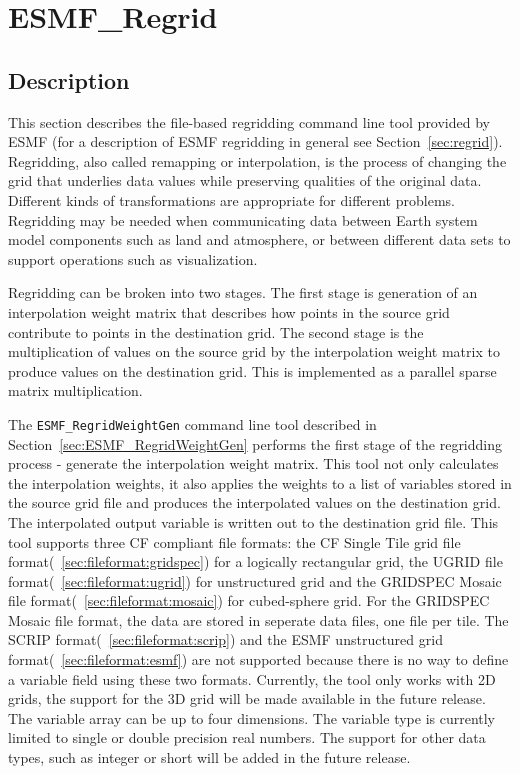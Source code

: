 
\section{ESMF\_Regrid}
\label{sec:ESMF_Regrid}

\subsection{Description}

This section describes the file-based regridding command line tool provided by ESMF (for a description of ESMF regridding in general see Section~\ref{sec:regrid}). Regridding, also called remapping or interpolation, is the process of changing the grid that underlies data values while preserving qualities of the original data. Different kinds of transformations are appropriate for different problems. Regridding may be needed when communicating data between Earth system model components such as land and atmosphere, or between different data sets to support operations such as visualization. 

Regridding can be broken into two stages. The first stage is generation of an interpolation weight matrix that describes how points in
the source grid contribute to points in the destination grid. The second stage is the multiplication of values on the source grid by the
interpolation weight matrix to produce values on the destination grid. This is implemented as a parallel sparse matrix multiplication.

The {\tt ESMF\_RegridWeightGen} command line tool described in Section~\ref{sec:ESMF_RegridWeightGen} 
performs the first stage of the regridding process - generate the interpolation weight matrix. 
This tool not only calculates the interpolation weights, it also applies the
weights to a list of variables 
stored in the source grid file and produces the interpolated values on the destination grid. 
The interpolated output variable is written out to the destination grid file.  This tool 
supports three CF compliant file formats: the CF Single Tile grid file format(~\ref{sec:fileformat:gridspec}) for
a logically rectangular grid, the UGRID file
format(~\ref{sec:fileformat:ugrid}) for unstructured grid and the GRIDSPEC
Mosaic file format(~\ref{sec:fileformat:mosaic}) for cubed-sphere grid.  For
the GRIDSPEC Mosaic file format, the data are stored in seperate data files,
one file per tile.   
The SCRIP format(~\ref{sec:fileformat:scrip}) and the ESMF unstructured grid format(~\ref{sec:fileformat:esmf}) are not supported because there is no way to define a variable field using these two formats. Currently, the tool only works with 2D grids, the support for the 3D grid will be 
made available in the future release.  The variable array can be up to four dimensions.  The
variable type is currently limited to single or double precision real numbers.  The support for 
other data types, such as integer or short will be added in the future release.  

